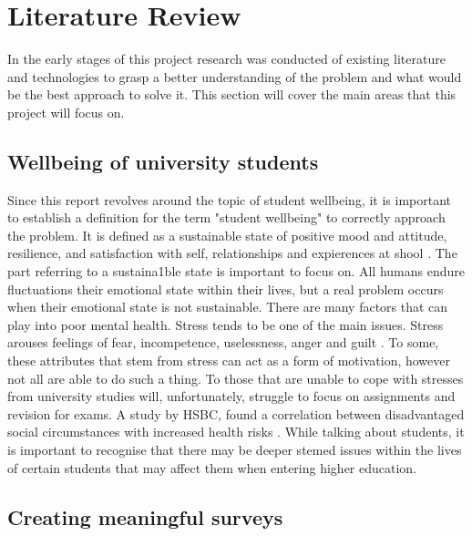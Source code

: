 \section{Literature Review}

In the early stages of this project research was conducted of existing literature and technologies to grasp a better understanding of the problem and what would be the best approach to solve it.
This section will cover the main areas that this project will focus on.

\subsection{Wellbeing of university students}

Since this report revolves around the topic of student wellbeing, it is important to establish a definition for the term "student wellbeing" to correctly approach the problem.
It is defined as a sustainable state of positive mood and attitude, resilience, and satisfaction with self, relationships and expierences at shool \cite{noble2008scoping}.
The part referring to a sustaina1ble state is important to focus on. All humans endure fluctuations their emotional state within their lives, but a real problem occurs when their emotional state is not sustainable.
There are many factors that can play into poor mental health. Stress tends to be one of the main issues. 
Stress arouses feelings of fear, incompetence, uselessness, anger and guilt \cite{turunen2014indoor}. 
To some, these attributes that stem from stress can act as a form of motivation, however not all are able to do such a thing.
To those that are unable to cope with stresses from university studies will, unfortunately, struggle to focus on assignments and revision for exams.
A study by HSBC, found a correlation between disadvantaged social circumstances with increased health risks \cite{currie2009social}.
While talking about students, it is important to recognise that there may be deeper stemed issues within the lives of certain students that may affect them when entering higher education.





\subsection{Creating meaningful surveys}

